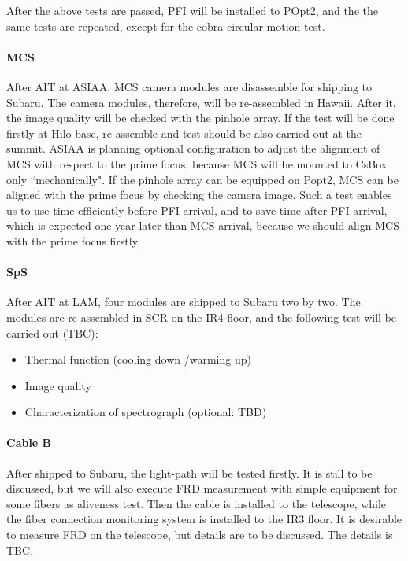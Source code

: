 After the above tests are passed, PFI will be installed to POpt2, and the the same tests are repeated, except for the cobra circular motion test.


\paragraph{MCS}
After AIT at ASIAA, MCS camera modules are disassemble for shipping to Subaru. 
The camera modules, therefore, will be re-assembled in Hawaii.
After it, the image quality will be checked with the pinhole array.
If the test will be done firstly at Hilo base, re-assemble and test should be also carried out at the summit.
ASIAA is planning optional configuration to adjust the alignment of MCS with respect to the prime focus, because MCS will be mounted to CsBox only ``mechanically".
If the pinhole array can be equipped on Popt2, MCS can be aligned with the prime focus by checking the camera image.
Such a test enables us to use time efficiently before PFI arrival, and to save time after PFI arrival, which is expected one year later than MCS arrival, because we should align MCS with the prime focus firstly.



\paragraph{SpS}
After AIT at LAM, four modules are shipped to Subaru two by two.
The modules are re-assembled in SCR on the IR4 floor, and the following test will be carried out (TBC):
\begin{itemize}
\item Thermal function (cooling down /warming up)
\item Image quality
\item Characterization of spectrograph  (optional: TBD)
\end{itemize}


\paragraph{Cable B}
After shipped to Subaru, the light-path will be tested firstly. 
It is still to be discussed, but we will also execute FRD measurement with simple equipment for some fibers as aliveness test.
Then the cable is installed to the telescope, while the fiber connection monitoring system is installed to the IR3 floor.
It is desirable to measure FRD on the telescope, but details are to be discussed.
The details is TBC.

